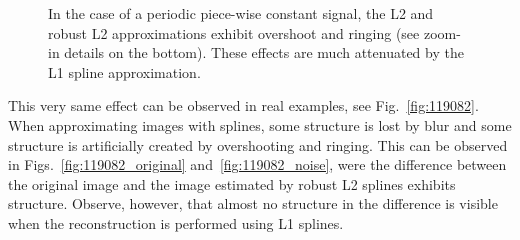 \documentclass[preprint]{imsart}
\begin{document}
\begin{figure*}
    \centerline{
    \hfill
    \hfill
    \hfill
    \hfill
    }
    
    \caption{In the case of a periodic piece-wise constant signal, the L2 and robust L2 approximations exhibit overshoot and ringing (see zoom-in details on the bottom). These effects are much attenuated by the L1 spline approximation.}
    \label{fig:square}
\end{figure*}

This very same effect can be observed in real examples, see Fig.~\ref{fig:119082}. When approximating images with splines, some structure is lost by blur and some structure is artificially created by overshooting and ringing. This can be observed in Figs.~\ref{fig:119082_original} and~\ref{fig:119082_noise}, were the difference between the original image and the image estimated by robust L2 splines exhibits structure. Observe, however, that almost no structure in the difference is visible when the reconstruction is performed using L1 splines.

\newlength{\mylength}
\setlength{\mylength}{0.234\textwidth}
\setlength{\fboxsep}{0pt}
\setlength{\fboxrule}{1pt}
\end{document}

